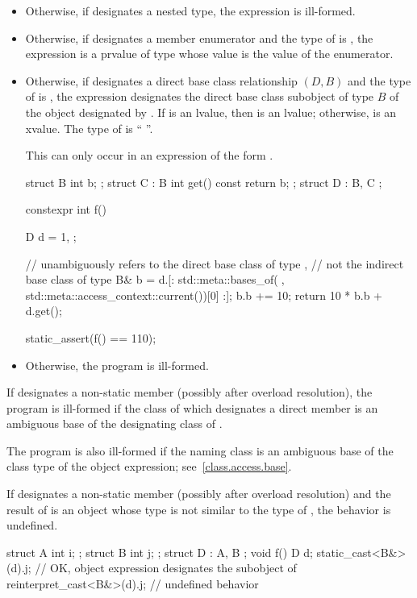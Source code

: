\begin{itemize}
\item
Otherwise, if  designates a nested type,
the expression  is ill-formed.

\item
Otherwise, if  designates a member enumerator and the type of 
is , the expression  is a prvalue of type 
whose value is the value of the enumerator.

\item
Otherwise, if  designates a direct base class relationship $(D, B)$
and the type of  is \cv{} ,
the expression designates the direct base class subobject of type $B$
of the object designated by .
If  is an lvalue,
then  is an lvalue;
otherwise,  is an xvalue.
The type of  is ``\cv{} ''.
\begin{note}
This can only occur in an expression of the form .
\end{note}
\begin{example}
\begin{codeblock}
struct B {
  int b;
};
struct C : B {
  int get() const { return b; }
};
struct D : B, C { };

constexpr int f() {
  D d = {1, {}};

  //  unambiguously refers to the direct base class of type ,
  // not the indirect base class of type 
  B& b = d.[: std::meta::bases_of(^^D, std::meta::access_context::current())[0] :];
  b.b += 10;
  return 10 * b.b + d.get();
}
static_assert(f() == 110);
\end{codeblock}
\end{example}

\item
Otherwise, the program is ill-formed.
\end{itemize}

\pnum
If  designates a non-static member
(possibly after overload resolution),
the program is ill-formed if the class of which  designates
a direct member is an ambiguous base of
the designating class of .
\begin{note}
The program is also ill-formed if the naming class is an ambiguous base of the class type
of the object expression; see~\ref{class.access.base}.
\end{note}

\pnum
If  designates a non-static member
(possibly after overload resolution) and
the result of  is an object whose type
is not similar to the type of ,
the behavior is undefined.
\begin{example}
\begin{codeblock}
struct A { int i; };
struct B { int j; };
struct D : A, B {};
void f() {
  D d;
  static_cast<B&>(d).j;             // OK, object expression designates the  subobject of 
  reinterpret_cast<B&>(d).j;        // undefined behavior
}
\end{codeblock}
\end{example}


